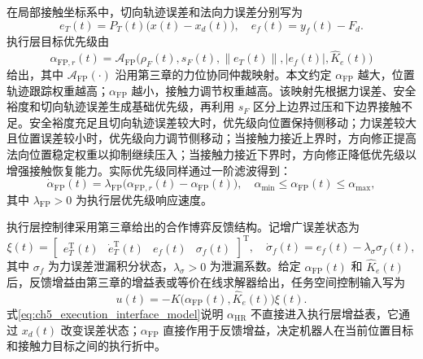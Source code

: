在局部接触坐标系中，切向轨迹误差和法向力误差分别写为
\begin{equation}
  e_T(t)=P_T(t)\bigl(x(t)-x_d(t)\bigr),
  \quad
  e_f(t)=y_f(t)-F_d.
  \label{eq:ch5_execution_error_model}
\end{equation}
执行层目标优先级由
\begin{equation}
  \alpha_{\mathrm{FP},r}(t)=
  \mathcal A_{\mathrm{FP}}
  \bigl(\rho_F(t),s_F(t),\left\|e_T(t)\right\|,\left|e_f(t)\right|,\hat K_e(t)\bigr)
  \label{eq:ch5_alpha_fp_map}
\end{equation}
给出，其中 $\mathcal A_{\mathrm{FP}}(\cdot)$ 沿用第三章的力位协同仲裁映射。本文约定 $\alpha_{\mathrm{FP}}$ 越大，位置轨迹跟踪权重越高；$\alpha_{\mathrm{FP}}$ 越小，接触力调节权重越高。该映射先根据力误差、安全裕度和切向轨迹误差生成基础优先级，再利用 $s_F$ 区分上边界过压和下边界接触不足。安全裕度充足且切向轨迹误差较大时，优先级向位置保持侧移动；力误差较大且位置误差较小时，优先级向力调节侧移动；当接触力接近上界时，方向修正提高法向位置稳定权重以抑制继续压入；当接触力接近下界时，方向修正降低优先级以增强接触恢复能力。实际优先级同样通过一阶滤波得到：
\begin{equation}
  \dot{\alpha}_{\mathrm{FP}}(t)=
  \lambda_{\mathrm{FP}}
  \bigl(\alpha_{\mathrm{FP},r}(t)-\alpha_{\mathrm{FP}}(t)\bigr),
  \quad
  \alpha_{\min}\le \alpha_{\mathrm{FP}}(t)\le \alpha_{\max},
  \label{eq:ch5_alpha_fp_filter_model}
\end{equation}
其中 $\lambda_{\mathrm{FP}}>0$ 为执行层优先级响应速度。

执行层控制律采用第三章给出的合作博弈反馈结构。记增广误差状态为
\begin{equation}
  \xi(t)=
  \begin{bmatrix}
    e_T^{\mathrm T}(t) & \dot e_T^{\mathrm T}(t) & e_f(t) & \sigma_f(t)
  \end{bmatrix}^{\mathrm T},
  \quad
  \dot\sigma_f(t)=e_f(t)-\lambda_\sigma\sigma_f(t),
  \label{eq:ch5_augmented_error_interface}
\end{equation}
其中 $\sigma_f$ 为力误差泄漏积分状态，$\lambda_\sigma>0$ 为泄漏系数。给定 $\alpha_{\mathrm{FP}}(t)$ 和 $\hat K_e(t)$ 后，反馈增益由第三章的增益表或等价在线求解器给出，任务空间控制输入写为
\begin{equation}
  u(t)=
  -K\bigl(\alpha_{\mathrm{FP}}(t),\hat K_e(t)\bigr)\xi(t).
  \label{eq:ch5_execution_interface_model}
\end{equation}
式\eqref{eq:ch5_execution_interface_model}说明 $\alpha_{\mathrm{HR}}$ 不直接进入执行层增益表，它通过 $x_d(t)$ 改变误差状态；$\alpha_{\mathrm{FP}}$ 直接作用于反馈增益，决定机器人在当前位置目标和接触力目标之间的执行折中。


